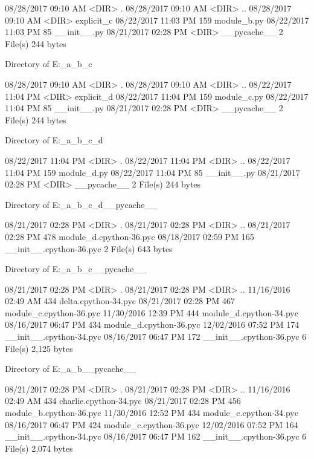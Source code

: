 08/28/2017  09:10 AM    <DIR>          .
08/28/2017  09:10 AM    <DIR>          ..
08/28/2017  09:10 AM    <DIR>          explicit_c
08/22/2017  11:03 PM               159 module_b.py
08/22/2017  11:03 PM                85 __init__.py
08/21/2017  02:28 PM    <DIR>          __pycache__
               2 File(s)            244 bytes

 Directory of E:\Python\apeman\mockup\simple\explicit_a\explicit_b\explicit_c

08/28/2017  09:10 AM    <DIR>          .
08/28/2017  09:10 AM    <DIR>          ..
08/22/2017  11:04 PM    <DIR>          explicit_d
08/22/2017  11:04 PM               159 module_c.py
08/22/2017  11:04 PM                85 __init__.py
08/21/2017  02:28 PM    <DIR>          __pycache__
               2 File(s)            244 bytes

 Directory of E:\Python\apeman\mockup\simple\explicit_a\explicit_b\explicit_c\explicit_d

08/22/2017  11:04 PM    <DIR>          .
08/22/2017  11:04 PM    <DIR>          ..
08/22/2017  11:04 PM               159 module_d.py
08/22/2017  11:04 PM                85 __init__.py
08/21/2017  02:28 PM    <DIR>          __pycache__
               2 File(s)            244 bytes

 Directory of E:\Python\apeman\mockup\simple\explicit_a\explicit_b\explicit_c\explicit_d\__pycache__

08/21/2017  02:28 PM    <DIR>          .
08/21/2017  02:28 PM    <DIR>          ..
08/21/2017  02:28 PM               478 module_d.cpython-36.pyc
08/18/2017  02:59 PM               165 __init__.cpython-36.pyc
               2 File(s)            643 bytes

 Directory of E:\Python\apeman\mockup\simple\explicit_a\explicit_b\explicit_c\__pycache__

08/21/2017  02:28 PM    <DIR>          .
08/21/2017  02:28 PM    <DIR>          ..
11/16/2016  02:49 AM               434 delta.cpython-34.pyc
08/21/2017  02:28 PM               467 module_c.cpython-36.pyc
11/30/2016  12:39 PM               444 module_d.cpython-34.pyc
08/16/2017  06:47 PM               434 module_d.cpython-36.pyc
12/02/2016  07:52 PM               174 __init__.cpython-34.pyc
08/16/2017  06:47 PM               172 __init__.cpython-36.pyc
               6 File(s)          2,125 bytes

 Directory of E:\Python\apeman\mockup\simple\explicit_a\explicit_b\__pycache__

08/21/2017  02:28 PM    <DIR>          .
08/21/2017  02:28 PM    <DIR>          ..
11/16/2016  02:49 AM               434 charlie.cpython-34.pyc
08/21/2017  02:28 PM               456 module_b.cpython-36.pyc
11/30/2016  12:52 PM               434 module_c.cpython-34.pyc
08/16/2017  06:47 PM               424 module_c.cpython-36.pyc
12/02/2016  07:52 PM               164 __init__.cpython-34.pyc
08/16/2017  06:47 PM               162 __init__.cpython-36.pyc
               6 File(s)          2,074 bytes


